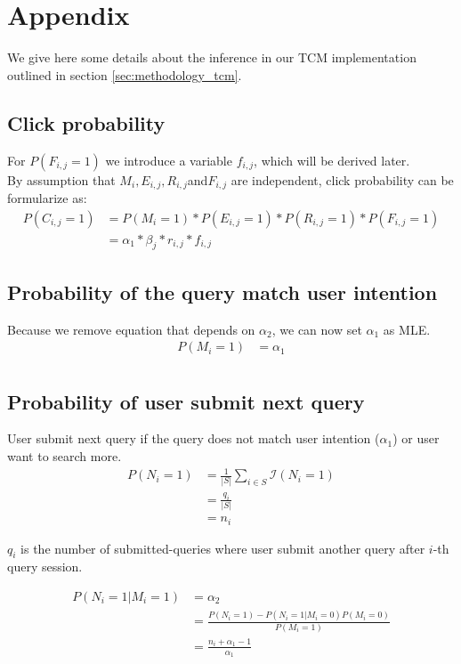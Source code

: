 \appendix
\section{Appendix}
\label{app:tcm_eq}
We give here some details about the inference in our TCM implementation outlined in section \ref{sec:methodology_tcm}.

\subsection{Click probability}
For $P(F_{i,j}=1)$ we introduce a variable $f_{i,j}$, which will be derived later. \\
By assumption that $M_i, E_{i,j},R_{i,j}$and$F_{i,j}$ are independent, click probability can be formularize as:
\begin{align}
P(C_{i,j} = 1)
&= P(M_i=1) * P(E_{i,j}=1) * P(R_{i,j}=1) * P(F_{i,j} = 1) \nonumber\\
&= \alpha_1 * \beta_j * r_{i,j} * f_{i,j}
\label{eq:proba_click}
\end{align}

\subsection{Probability of the query match user intention}
Because we remove equation that depends on $\alpha_2$, we can now set $\alpha_1$ as MLE.
\begin{align*}
P(M_i = 1) 
&= \alpha_1 \\
\end{align*}

\subsection{Probability of user submit next query}
User submit next query if the query does not match user intention ($\alpha_1$) or user want to search more.
\begin{align*}
P(N_i=1) 
&= \frac{1}{|S|} \sum_{i\in S} \mathcal{I}(N_i=1) \\
&= \frac{q_i}{|S|} \\
&= n_i
\end{align*}

$q_i$ is the number of submitted-queries where user submit another query after $i$-th query session.

\begin{align*}
P(N_i=1|M_i=1) 
&= \alpha_2 \\
&= \frac{P(N_i=1) - P(N_i=1|M_i=0)P(M_i=0)}{P(M_i=1)} \\
&= \frac{n_i + \alpha_1 - 1}{\alpha_1}
\end{align*}

